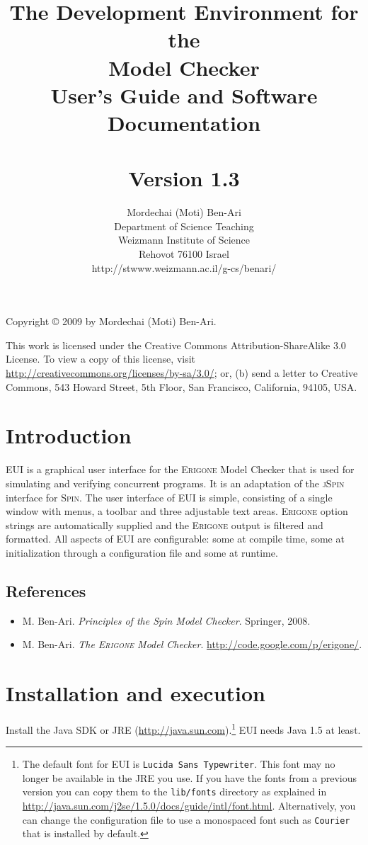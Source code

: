 \documentclass[11pt]{article}
\title{The \eui{} Development Environment for the\\
\eri{} Model Checker\\User's Guide and Software Documentation\\
\mbox{}\\\large{Version 1.3}}
\author{Mordechai (Moti) Ben-Ari\\
Department of Science Teaching\\
Weizmann Institute of Science\\
Rehovot 76100 Israel\\
\textsf{http://stwww.weizmann.ac.il/g-cs/benari/}}
\newcommand{\eri}{\textsc{Erigone}}
\newcommand{\eui}{\textsc{EUI}}
\newcommand{\p}[1]{\texttt{#1}}
\begin{document}
\maketitle
\thispagestyle{empty}

\vfill

\begin{center}
Copyright \copyright{} 2009 by Mordechai (Moti) Ben-Ari.
\end{center}

This work is licensed under the Creative Commons Attribution-ShareAlike 3.0
License. To view a copy of this license, visit
\url{http://creativecommons.org/licenses/by-sa/3.0/}; or, (b) send a letter
to Creative Commons, 543 Howard Street, 5th Floor, San Francisco,
California, 94105, USA.

\newpage

\section{Introduction}

\eui{} is a graphical user interface for the \eri{} Model Checker that
is used for simulating and verifying concurrent programs. It is an
adaptation of the \textsc{jSpin} interface for \textsc{Spin}. The user
interface of \eui{} is simple, consisting of a single window with menus,
a toolbar and three adjustable text areas. \eri{} option strings are
automatically supplied and the \eri{} output is filtered and formatted.
All aspects of \eui{} are configurable: some at compile time, some at
initialization through a configuration file and some at runtime.

\subsection*{References}
\begin{itemize}
\item M. Ben-Ari. \textit{Principles of the Spin Model Checker}. Springer, 2008.
\item M. Ben-Ari. \textit{The \eri{} Model Checker}. \url{http://code.google.com/p/erigone/}.
\end{itemize}

\section{Installation and execution}
Install the Java SDK or JRE (\url{http://java.sun.com}).\footnote{The
default font for \eui{} is \p{Lucida Sans Typewriter}. This font may no longer be
available in the JRE you use. If you have the fonts from a previous version you
can copy them to the \p{lib/fonts} directory as explained in
\url{http://java.sun.com/j2se/1.5.0/docs/guide/intl/font.html}. Alternatively,
you can change the configuration file to use a monospaced font such as
\p{Courier} that is installed by default.} \eui{} needs Java 1.5 at least.
\end{document}
